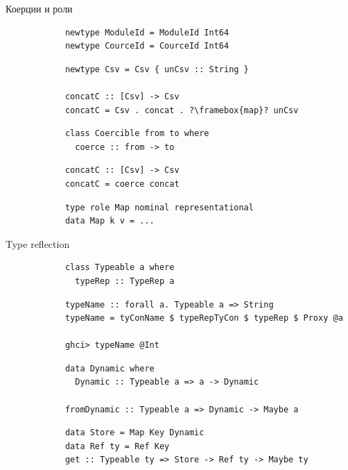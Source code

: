     \begin{frame}[fragile]{Коерции и роли}
        \pause
        \begin{verbatim}
            newtype ModuleId = ModuleId Int64
            newtype CourceId = CourceId Int64
        \end{verbatim}
        \pause\vspace{1em}
        \begin{verbatim}
            newtype Csv = Csv { unCsv :: String }

            concatC :: [Csv] -> Csv
            concatC = Csv . concat . ?\framebox{map}? unCsv
        \end{verbatim}
        \pause\vspace{1em}
        \begin{verbatim}
            class Coercible from to where
              coerce :: from -> to
        \end{verbatim}
        \pause\vspace{1em}
        \begin{verbatim}
            concatC :: [Csv] -> Csv
            concatC = coerce concat
        \end{verbatim}
        \pause\vspace{1em}
        \begin{verbatim}
            type role Map nominal representational
            data Map k v = ...
        \end{verbatim}
    \end{frame}

    \begin{frame}[fragile]{Type reflection}
        \pause
        \begin{verbatim}
            class Typeable a where
              typeRep :: TypeRep a
        \end{verbatim}
        \pause\vspace{1em}
        \begin{verbatim}
            typeName :: forall a. Typeable a => String
            typeName = tyConName $ typeRepTyCon $ typeRep $ Proxy @a

            ghci> typeName @Int
        \end{verbatim}
        \pause\vspace{1em}
        \begin{verbatim}
            data Dynamic where
              Dynamic :: Typeable a => a -> Dynamic

            fromDynamic :: Typeable a => Dynamic -> Maybe a
        \end{verbatim}
        \pause\vspace{1em}
        \begin{verbatim}
            data Store = Map Key Dynamic
            data Ref ty = Ref Key
            get :: Typeable ty => Store -> Ref ty -> Maybe ty
        \end{verbatim}
    \end{frame}

